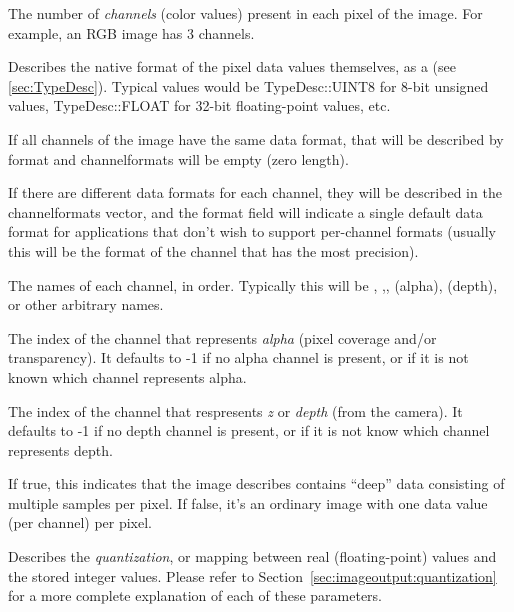 The number of \emph{channels} (color values) present in each pixel of
the image.  For example, an RGB image has 3 channels.
\apiend


Describes the native format of the pixel data values themselves, as a
\TypeDesc (see \ref{sec:TypeDesc}).  Typical values would be 
{\cf TypeDesc::UINT8} for 8-bit unsigned values, {\cf TypeDesc::FLOAT}
for 32-bit floating-point values, etc.

If all channels of the image have the same data format, that will
be described by {\cf format} and {\cf channelformats} will be empty
(zero length).

If there are different data formats for each channel, they will be
described in the {\cf channelformats} vector, and the {\cf format} field
will indicate a single default data format for applications that don't
wish to support per-channel formats (usually this will be the format
of the channel that has the most precision).
\apiend

The names of each channel, in order.  Typically this will be ,
,,  (alpha),  (depth), or other arbitrary
names.
\apiend

The index of the channel that represents \emph{alpha} (pixel coverage
and/or transparency).  It defaults to -1 if no alpha channel is present,
or if it is not known which channel represents alpha.
\apiend

The index of the channel that respresents \emph{z} or \emph{depth} (from
the camera).  It defaults to -1 if no depth channel is present, or if it
is not know which channel represents depth.
\apiend

If {\cf true}, this indicates that the image describes contains ``deep''
data consisting of multiple samples per pixel.  If {\cf false}, it's an
ordinary image with one data value (per channel) per pixel.
\apiend

Describes the \emph{quantization}, or mapping between real
(floating-point) values and the stored integer values.
Please refer to Section~\ref{sec:imageoutput:quantization} for
a more complete explanation of each of these parameters.
\apiend

